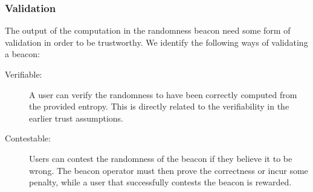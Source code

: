 \subsubsection{Validation}
The output of the computation in the randomness beacon need some form of validation in order to be trustworthy.
We identify the following ways of validating a beacon:

\begin{description}
    \item[Verifiable:]
        A user can verify the randomness to have been correctly computed from the provided entropy.
        This is directly related to the verifiability in the earlier trust assumptions. 

    \item[Contestable:]
        Users can contest the randomness of the beacon if they believe it to be wrong.
        The beacon operator must then prove the correctness or incur some penalty, while a user that successfully contests the beacon is rewarded. 
\end{description}


